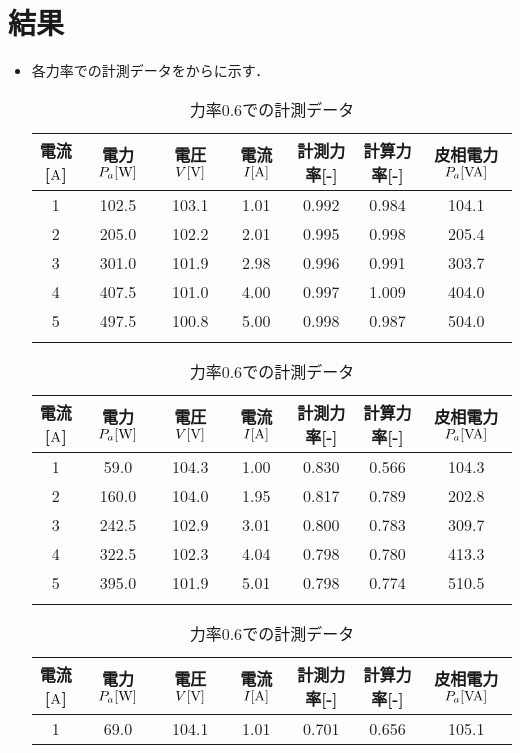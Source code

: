 \clearpage
\section{結果}
\begin{itemize}
	\item 各力率での計測データをから\wtab{}に示す．
\begin{table}[h]
	\centering
	\caption{力率$1.0$での計測データ}
	\label{tab:1data}
\begin{tabular}{ccccccc}
	\hline
	電流[$\rm{A}$] & 電力$P_a[\rm{W}]$ & 電圧$V[\rm{V}]$ & 電流$I[\rm{A}]$ & 計測力率[\rm{-}]  & 計算力率[-]  & 皮相電力$P_a[\rm{VA}]$ \\ \hline
	1            & 102.5   & 103.1   & 1.01  & 0.992 & 0.984 & 104.1   \\
	2            & 205.0   & 102.2   & 2.01  & 0.995 & 0.998 & 205.4   \\
	3            & 301.0   & 101.9   & 2.98  & 0.996 & 0.991 & 303.7   \\
	4            & 407.5   & 101.0         & 4.00  & 0.997 & 1.009 & 404.0   \\
	5            & 497.5   & 100.8         & 5.00  & 0.998 & 0.987 & 504.0     \\ \hline\\
\end{tabular}
\hfill
	\caption{力率$0.8$での計測データ}
	\label{tab:0.8data}
\begin{tabular}{ccccccc}
	\hline
	電流[$\rm{A}$] & 電力$P_a[\rm{W}]$ & 電圧$V[\rm{V}]$ & 電流$I[\rm{A}]$ & 計測力率[-] & 計算力率[-] & 皮相電力$P_a[\rm{VA}]$ \\ \hline
	1 & 59.0  & 104.3 & 1.00 & 0.830 & 0.566 & 104.3 \\
	2 & 160.0 & 104.0 & 1.95 & 0.817 & 0.789 & 202.8 \\
	3 & 242.5 & 102.9 & 3.01 & 0.800 & 0.783 & 309.7 \\
	4 & 322.5 & 102.3 & 4.04 & 0.798 & 0.780 & 413.3 \\
	5 & 395.0 & 101.9 & 5.01 & 0.798 & 0.774 & 510.5 \\ \hline\\
\end{tabular}
	\caption{力率$0.6$での計測データ}
	\label{tab:0.6data}
\begin{tabular}{ccccccc}
	\hline
	電流[$\rm{A}$] & 電力$P_a[\rm{W}]$ & 電圧$V[\rm{V}]$ & 電流$I[\rm{A}]$ & 計測力率[-] & 計算力率[-] & 皮相電力$P_a[\rm{VA}]$ \\ \hline
	1 & 69.0  & 104.1 & 1.01 & 0.701 & 0.656 & 105.1 \\

\end{tabular}
\end{table}
\end{itemize}
